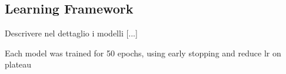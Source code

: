 \subsection{Learning Framework}
\label{sec:learning_framework}

Descrivere nel dettaglio i modelli
[...]

Each model was trained for 50 epochs, using early stopping and reduce lr on plateau %

%
%
%
%
